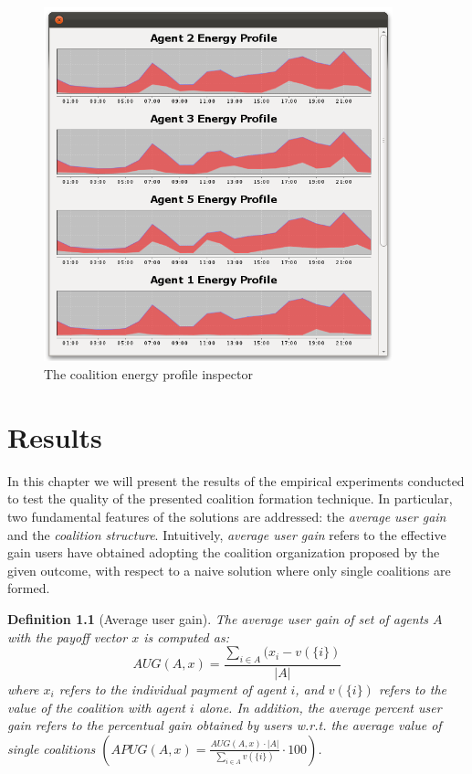 \documentclass[11pt, twoside, titlepage, a4paper, openright]{report}
\newtheorem{Def}{Definition}
\begin{document}
\begin{figure}[!h]
	\centering
	\includegraphics[width=0.9\textwidth]{img/profiles.png}
	\caption{\label{fig:simulatorb}The coalition energy profile inspector}
\end{figure}


\chapter{Results}\label{chap:results}

In this chapter we will present the results of the empirical experiments conducted to test the quality of the presented coalition formation technique. In particular, two fundamental features of the solutions are addressed: the \textit{average user gain} and the \textit{coalition structure}. Intuitively, \textit{average user gain} refers to the effective gain users have obtained adopting the coalition organization proposed by the given outcome, with respect to a naive solution where only single coalitions are formed.

\begin{Def}[Average user gain]
The \textit{average user gain} of set of agents $A$ with the payoff vector $x$ is computed as:
\begin{equation}\label{eq:aug}
AUG(A,x)=\frac{\sum_{i\in A}(x_i-v(\{i\})}{|A|}
\end{equation}
where $x_i$ refers to the individual payment of agent $i$, and $v(\{i\})$ refers to the value of the coalition with agent $i$ alone. In addition, the \textit{average percent user gain} refers to the percentual gain obtained by users w.r.t. the average value of single coalitions $(APUG(A,x)=\frac{AUG(A,x)\cdot |A|}{\sum_{i\in A}v(\{i\})}\cdot 100)$.
\end{Def}
\end{document}
